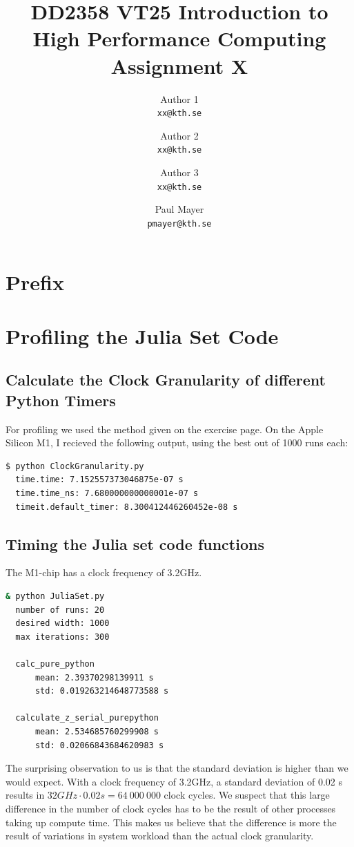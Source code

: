 \documentclass[a4paper,12pt]{article}
\title{
  \normalsize{DD2358 VT25 Introduction to}\\
  \normalsize{High Performance Computing}\\
  \large{Assignment X}\\
}
\author{
  \small Author 1\\[-0.75ex]
  \scriptsize\texttt{xx@kth.se}
  \and
  \small Author 2\\[-0.75ex]
  \scriptsize\texttt{xx@kth.se}
  \and
  \small Author 3\\[-0.75ex]
  \scriptsize\texttt{xx@kth.se}
  \and
  \small Paul Mayer\\[-0.75ex]
  \scriptsize\texttt{pmayer@kth.se}
}
\date{}
\begin{document}
\maketitle
\thispagestyle{firstpagestyle}

\listoftodos

\vspace{1em}

%
\section*{Prefix}

%

\section{Profiling the Julia Set Code}
\subsection{Calculate the Clock Granularity of different Python Timers}
For profiling we used the method given on the exercise page.
On the Apple Silicon M1, I recieved the following output, using the best out of 1000 runs each:
\begin{lstlisting}[language=bash,basicstyle=\ttfamily]
  $ python ClockGranularity.py
  time.time: 7.152557373046875e-07 s
  time.time_ns: 7.680000000000001e-07 s
  timeit.default_timer: 8.300412446260452e-08 s
\end{lstlisting}

\subsection{Timing the Julia set code functions}
The M1-chip has a clock frequency of 3.2GHz.
\begin{lstlisting}[language=bash,basicstyle=\ttfamily]
  & python JuliaSet.py
  number of runs: 20
  desired width: 1000
  max iterations: 300

  calc_pure_python
      mean: 2.39370298139911 s
      std: 0.019263214648773588 s

  calculate_z_serial_purepython
      mean: 2.534685760299908 s
      std: 0.02066843684620983 s
\end{lstlisting}
The surprising observation to us is that the standard deviation is higher than we would expect.
With a clock frequency of 3.2GHz, a standard deviation of 0.02 s results in $32GHz \cdot 0.02s = 64\ 000\ 000$ clock cycles.
We suspect that this large difference in the number of clock cycles has to be the result of other processes taking up compute time.
This makes us believe that the difference is more the result of variations in system workload than the actual clock granularity.
\end{document}
